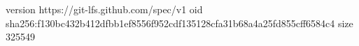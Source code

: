 version https://git-lfs.github.com/spec/v1
oid sha256:f130bc432b412dfbb1ef8556f952cdf135128cfa31b68a4a25fd855cff6584c4
size 325549
